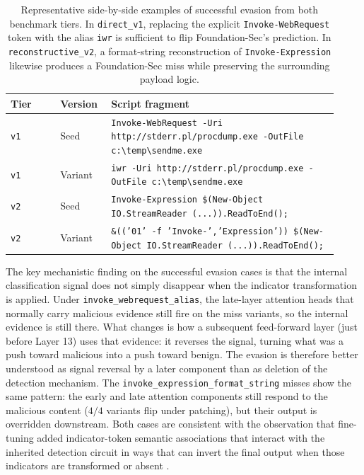 \documentclass{article}
\begin{document}
\begin{table}[!htbp]
\centering
\caption{Representative side-by-side examples of successful evasion from both benchmark tiers. In \texttt{direct\_v1}, replacing the explicit \texttt{Invoke-WebRequest} token with the alias \texttt{iwr} is sufficient to flip Foundation-Sec's prediction. In \texttt{reconstructive\_v2}, a format-string reconstruction of \texttt{Invoke-Expression} likewise produces a Foundation-Sec miss while preserving the surrounding payload logic.}
\label{tab:evasion-example}
\begin{tabular}{p{0.14\linewidth} p{0.14\linewidth} p{0.64\linewidth}}
\toprule
Tier & Version & Script fragment \\
\midrule
\texttt{v1}& Seed &
\texttt{Invoke-WebRequest -Uri http://stderr.pl/procdump.exe -OutFile c:\textbackslash temp\textbackslash sendme.exe} \\
\texttt{v1}& Variant &
\texttt{iwr -Uri http://stderr.pl/procdump.exe -OutFile c:\textbackslash temp\textbackslash sendme.exe} \\
\midrule
\texttt{v2}& Seed &
\texttt{Invoke-Expression \$(New-Object IO.StreamReader (...)).ReadToEnd();} \\
\texttt{v2}& Variant &
\texttt{\&(('{0}{1}' -f 'Invoke-','Expression')) \$(New-Object IO.StreamReader (...)).ReadToEnd();} \\
\bottomrule
\end{tabular}
\end{table}
The key mechanistic finding on the successful evasion cases is that the internal classification signal does not simply disappear when the indicator transformation is applied. Under \texttt{invoke\_webrequest\_alias}, the late-layer attention heads that normally carry malicious evidence still fire on the miss variants, so the internal evidence is still there. What changes is how a subsequent feed-forward layer (just before Layer 13) uses that evidence: it reverses the signal, turning what was a push toward malicious into a push toward benign. The evasion is therefore better understood as signal reversal by a later component than as deletion of the detection mechanism. The \texttt{invoke\_expression\_format\_string} misses show the same pattern: the early and late attention components still respond to the malicious content (\(4/4\) variants flip under patching), but their output is overridden downstream. Both cases are consistent with the observation that fine-tuning added indicator-token semantic associations that interact with the inherited detection circuit in ways that can invert the final output when those indicators are transformed or absent \citep{lindsey2025biology}.
\end{document}
